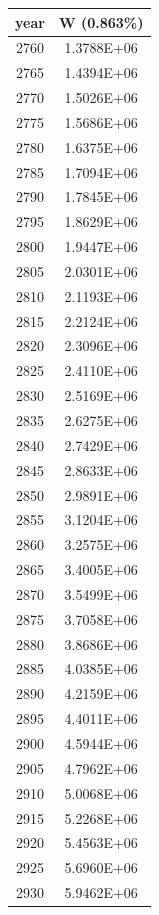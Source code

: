 \documentclass[a4paper]{article}
\begin{document}
	\begin{tabular}{|c|c|}
		\hline
		year & W (0.863\%) \\
		\hline
		2760 & 1.3788E+06 \\
		\hline
		2765 & 1.4394E+06 \\
		\hline
		2770 & 1.5026E+06 \\
		\hline
		2775 & 1.5686E+06 \\
		\hline
		2780 & 1.6375E+06 \\
		\hline
		2785 & 1.7094E+06 \\
		\hline
		2790 & 1.7845E+06 \\
		\hline
		2795 & 1.8629E+06 \\
		\hline
		2800 & 1.9447E+06 \\
		\hline
		2805 & 2.0301E+06 \\
		\hline
		2810 & 2.1193E+06 \\
		\hline
		2815 & 2.2124E+06 \\
		\hline
		2820 & 2.3096E+06 \\
		\hline
		2825 & 2.4110E+06 \\
		\hline
		2830 & 2.5169E+06 \\
		\hline
		2835 & 2.6275E+06 \\
		\hline
		2840 & 2.7429E+06 \\
		\hline
		2845 & 2.8633E+06 \\
		\hline
		2850 & 2.9891E+06 \\
		\hline
		2855 & 3.1204E+06 \\
		\hline
		2860 & 3.2575E+06 \\
		\hline
		2865 & 3.4005E+06 \\
		\hline
		2870 & 3.5499E+06 \\
		\hline
		2875 & 3.7058E+06 \\
		\hline
		2880 & 3.8686E+06 \\
		\hline
		2885 & 4.0385E+06 \\
		\hline
		2890 & 4.2159E+06 \\
		\hline
		2895 & 4.4011E+06 \\
		\hline
		2900 & 4.5944E+06 \\
		\hline
		2905 & 4.7962E+06 \\
		\hline
		2910 & 5.0068E+06 \\
		\hline
		2915 & 5.2268E+06 \\
		\hline
		2920 & 5.4563E+06 \\
		\hline
		2925 & 5.6960E+06 \\
		\hline
		2930 & 5.9462E+06 \\

\end{tabular}
\end{document}
